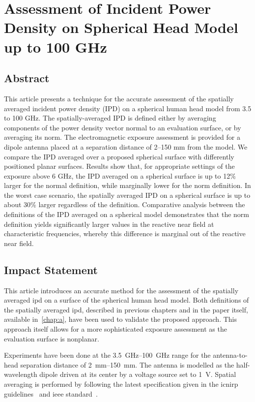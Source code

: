 \section{Assessment of Incident Power Density on Spherical Head Model up to 100 GHz}
\label{sec:publication_1}
\subsection{Abstract}
This article presents a technique for the accurate assessment of the spatially averaged incident power density (IPD) on a spherical human head model from 3.5 to 100 GHz.
The spatially-averaged IPD is defined either by averaging components of the power density vector normal to an evaluation surface, or by averaging its norm.
The electromagnetic exposure assessment is provided for a dipole antenna placed at a separation distance of 2--150 mm from the model.
We compare the IPD averaged over a proposed spherical surface with differently positioned planar surfaces.
Results show that, for appropriate settings of the exposure above 6 GHz, the IPD averaged on a spherical surface is up to 12\% larger for the normal definition, while marginally lower for the norm definition.
In the worst case scenario, the spatially averaged IPD on a spherical surface is up to about 30\% larger regardless of the definition.
Comparative analysis between the definitions of the IPD averaged on a spherical model demonstrates that the norm definition yields significantly larger values in the reactive near field at characteristic frequencies, whereby this difference is marginal out of the reactive near field.

\subsection{Impact Statement}
This article introduces an accurate method for the assessment of the spatially averaged \gls{ipd} on a surface of the spherical human head model.
Both definitions of the spatially averaged \gls{ipd}, described in previous chapters and in the paper itself, available in~\cref{chap:a}, have been used to validate the proposed approach.
This approach itself allows for a more sophisticated exposure assessment as the evaluation surface is nonplanar.

Experiments have been done at the \SIrange{3.5}{100}{\GHz} range for the antenna-to-head separation distance of \SIrange{2}{150}{\mm}.
The antenna is modelled as the half-wavelength dipole driven at its center by a voltage source set to \SI{1}{V}.
Spatial averaging is performed by following the latest specification given in the \gls{icnirp} guidelines~\cite{ICNIRP2020Guidelines} and \gls{ieee} standard~\cite{IEEE2019Standard}.

